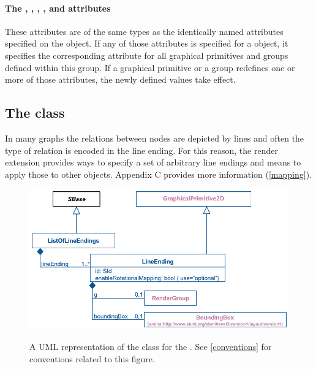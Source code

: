 \paragraph{The \fixttspace{}, \fixttspace{}, \fixttspace{} , \fixttspace{},  \fixttspace{} and\fixttspace{} attributes}

These attributes are of the same types as the identically named attributes specified on the \Text object.   If any of those attributes is specified for a \RenderGroup object, it 
specifies the corresponding attribute for all graphical primitives and groups 
defined within this group. If a graphical primitive or a group redefines one or 
more of those attributes, the newly defined values take effect.

\subsection{The  class}
\label{lineending-class}

In many graphs the relations between nodes are depicted by lines and often the 
type of relation is encoded in the line ending. For this reason, the render
extension provides ways to specify a set of arbitrary line endings and means to
apply those to other objects. Appendix C provides more information (\ref{mapping}).

\begin{figure}[h!]
  \centering
  \includegraphics[width=\textwidth]{images/render-line-endings-uml}\\
  \caption{A UML representation of the \LineEnding class for the \RenderPackage.  See \ref{conventions} for conventions related to this figure. }
  \label{fig:line_ending_render_uml}
\end{figure}


